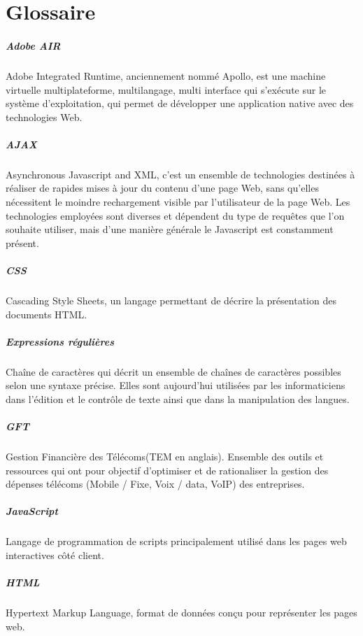 \chapter{Glossaire}
\paragraph{Adobe AIR} Adobe Integrated Runtime, anciennement nommé Apollo, est une machine virtuelle multiplateforme, multilangage, multi interface qui s'exécute sur le système d'exploitation, qui permet de développer une application native avec des technologies Web.
\paragraph{AJAX}
Asynchronous Javascript and XML, c'est un ensemble de technologies destinées à réaliser de rapides mises à jour du contenu d'une page Web, sans qu'elles nécessitent le moindre rechargement visible par l'utilisateur de la page Web. Les technologies employées sont diverses et dépendent du type de requêtes que l'on souhaite utiliser, mais d'une manière générale le Javascript est constamment présent.
\paragraph{CSS} Cascading Style Sheets, un langage permettant de décrire la présentation des documents HTML.
\paragraph{Expressions régulières} Chaîne de caractères qui décrit un ensemble de chaînes de caractères possibles selon une syntaxe précise. Elles sont aujourd’hui utilisées par les informaticiens dans l’édition et le contrôle de texte ainsi que dans la manipulation des langues.
\paragraph{GFT} Gestion Financière des Télécoms(TEM en anglais). Ensemble des outils et ressources qui ont pour objectif d’optimiser et de rationaliser la gestion des dépenses télécoms (Mobile / Fixe, Voix / data, VoIP) des entreprises.
\paragraph{JavaScript} Langage de programmation de scripts principalement utilisé dans les pages web interactives côté client.
\paragraph{HTML} Hypertext Markup Language, format de données conçu pour représenter les
pages web.
